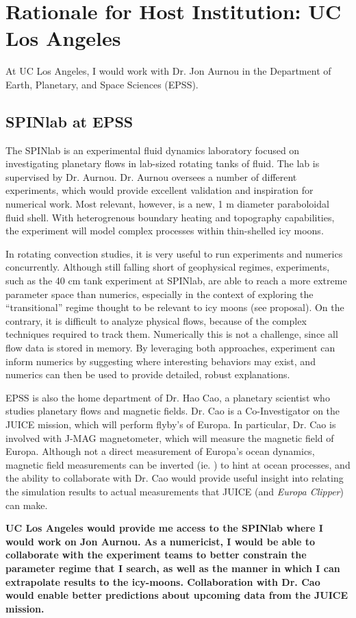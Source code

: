 \documentclass{article}
\title{}
\author{}
\date{}
\begin{document}
\section*{Rationale for Host Institution: UC Los Angeles}
At UC Los Angeles, I would work with Dr. Jon Aurnou in the Department of Earth, Planetary, and Space Sciences (EPSS).
\subsection*{SPINlab at EPSS}
The SPINlab is an experimental fluid dynamics laboratory focused on investigating planetary flows in lab-sized rotating tanks of fluid. The lab is supervised by Dr. Aurnou. Dr. Aurnou oversees a number of different experiments, which would provide excellent validation and inspiration for numerical work. Most relevant, however, is a new, 1 m diameter paraboloidal fluid shell. With heterogrenous boundary heating and topography capabilities, the experiment will model complex processes within thin-shelled icy moons.

In rotating convection studies, it is very useful to run experiments and numerics concurrently. Although still falling short of geophysical regimes, experiments, such as the 40 cm tank experiment\cite{jA23} at SPINlab, are able to reach a more extreme parameter space than numerics, especially in the context of exploring the ``transitional'' regime thought to be relevant to icy moons (see proposal). On the contrary, it is difficult to analyze physical flows, because of the complex techniques required to track them. Numerically this is not a challenge, since all flow data is stored in memory. By leveraging both approaches, experiment can inform numerics by suggesting where interesting behaviors may exist, and numerics can then be used to provide detailed, robust explanations.

EPSS is also the home department of Dr. Hao Cao, a planetary scientist who studies planetary flows and magnetic fields. Dr. Cao is a Co-Investigator on the JUICE mission, which will perform flyby's of Europa. In particular, Dr. Cao is involved with J-MAG magnetometer, which will measure the magnetic field of Europa.
Although not a direct measurement of Europa's ocean dynamics, magnetic field measurements can be inverted (ie. \cite{nG15,dJ88}) to hint at ocean processes, and the ability to collaborate with Dr. Cao would provide useful insight into relating the simulation results to actual measurements that JUICE (and \textit{Europa Clipper}) can make.

\textbf{UC Los Angeles would provide me access to the SPINlab where I would work on Jon Aurnou. As a numericist, I would be able to collaborate with the experiment teams to better constrain the parameter regime that I search, as well as the manner in which I can extrapolate results to the icy-moons. Collaboration with Dr. Cao would enable better predictions about upcoming data from the JUICE mission.}
\printbibliography
\end{document}
